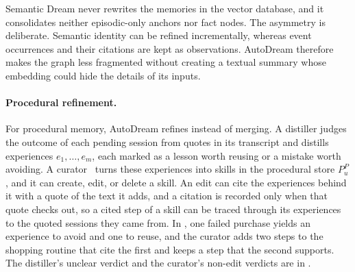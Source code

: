 Semantic Dream never rewrites the memories in the vector database, and it consolidates neither
episodic-only anchors nor fact nodes. The asymmetry is deliberate. Semantic
identity can be refined incrementally, whereas event occurrences and their
citations are kept as observations. AutoDream therefore makes the graph less
fragmented without creating a textual summary whose embedding could hide the
details of its inputs.

\paragraph{Procedural refinement.}
For procedural memory, AutoDream refines instead of merging. A distiller judges
the outcome of each pending session from quotes in its transcript and distills
experiences \(e_1,\ldots,e_m\), each marked as a lesson worth reusing or a
mistake worth avoiding. A curator~\citep{zhang2026ace} turns these experiences
into skills in the procedural store \(P_u^P\), and it can create, edit, or
delete a skill. An edit can cite the experiences behind it with a quote of the
text it adds, and a citation is recorded only when that quote checks out, so a
cited step of a skill can be traced through its experiences to the quoted
sessions they came from. In , one failed purchase
yields an experience to avoid and one to reuse, and the curator adds two steps
to the shopping routine that cite the first and keeps a step that the second
supports. The distiller's unclear verdict and the curator's non-edit verdicts are in .

